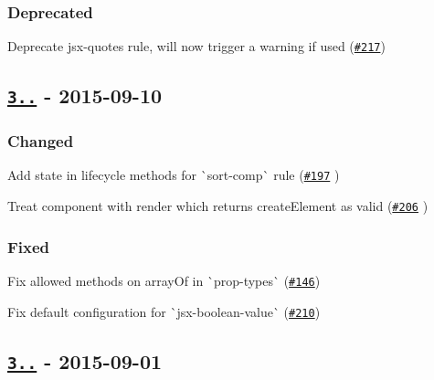 \subsubsection*{Deprecated}


\begin{DoxyItemize}
\item Deprecate {\ttfamily jsx-\/quotes} rule, will now trigger a warning if used (\href{https://github.com/yannickcr/eslint-plugin-react/issues/217}{\tt \#217})
\end{DoxyItemize}

\subsection*{\href{https://github.com/yannickcr/eslint-plugin-react/compare/v3.3.1...v3.3.2}{\tt 3..} -\/ 2015-\/09-\/10}

\subsubsection*{Changed}


\begin{DoxyItemize}
\item Add {\ttfamily state} in lifecycle methods for \`{}sort-\/comp\`{} rule (\href{https://github.com/yannickcr/eslint-plugin-react/pull/197}{\tt \#197} )
\item Treat component with render which returns {\ttfamily create\+Element} as valid (\href{https://github.com/yannickcr/eslint-plugin-react/pull/206}{\tt \#206} )
\end{DoxyItemize}

\subsubsection*{Fixed}


\begin{DoxyItemize}
\item Fix allowed methods on array\+Of in \`{}prop-\/types\`{} (\href{https://github.com/yannickcr/eslint-plugin-react/issues/146}{\tt \#146})
\item Fix default configuration for \`{}jsx-\/boolean-\/value\`{} (\href{https://github.com/yannickcr/eslint-plugin-react/issues/210}{\tt \#210})
\end{DoxyItemize}

\subsection*{\href{https://github.com/yannickcr/eslint-plugin-react/compare/v3.3.0...v3.3.1}{\tt 3..} -\/ 2015-\/09-\/01}

